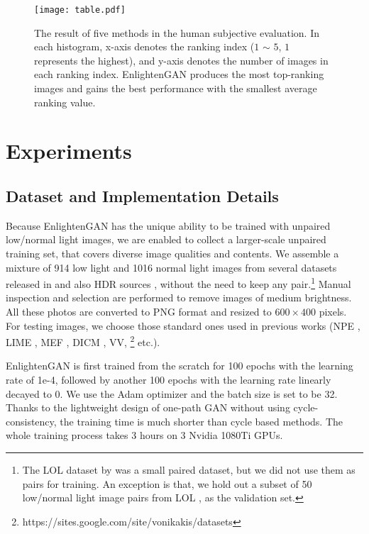 \documentclass[journal]{IEEEtran}
\begin{document}
\begin{figure*}[!ht]
\centering
\texttt{[image: table.pdf]}
\caption{The result of five methods in the human subjective evaluation. In each histogram, x-axis denotes the ranking index ($1$ $\sim$ $5$, $1$ represents the highest), and y-axis denotes the number of images in each ranking index. EnlightenGAN produces the most top-ranking images and gains the best performance with the smallest average ranking value.}
\label{fig:table}
\end{figure*}









\section{Experiments}

\subsection{Dataset and Implementation Details}
\label{unpaired}
Because EnlightenGAN has the unique ability to be trained with unpaired low/normal light images, we are enabled to collect a larger-scale unpaired training set, that covers diverse image qualities and contents. We assemble a mixture of 914 low light and 1016 normal light images from several datasets released in \cite{dang2015raise,wei2018deep} and also HDR sources \cite{kalantari2017deep,cai2018learning}, without the need to keep any pair.\footnote{The LOL dataset by \cite{wei2018deep} was a small paired dataset, but we did not use them as pairs for training. An exception is that, we hold out a subset of 50 low/normal light image pairs from LOL \cite{wei2018deep}, as the validation set.} Manual inspection and selection are performed to remove images of medium brightness. All these photos are converted to PNG format and resized to $600 \times 400$ pixels. For testing images, we choose those standard ones used in previous works (NPE \cite{wang2013naturalness}, LIME \cite{guo2017lime}, MEF \cite{ma2015perceptual}, DICM \cite{lee2012contrast}, VV, \footnote{https://sites.google.com/site/vonikakis/datasets} etc.).












EnlightenGAN is first trained from the scratch for 100 epochs with the learning rate of 1e-4, followed by another 100 epochs with the learning rate linearly decayed to 0. We use the Adam optimizer and the batch size is set to be 32. Thanks to the lightweight design of one-path GAN without using cycle-consistency, the training time is much shorter than cycle based methods. The whole training process takes 3 hours on 3 Nvidia 1080Ti GPUs.
\end{document}
